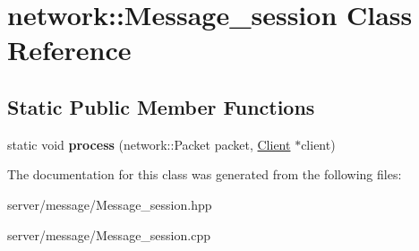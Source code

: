 \hypertarget{classnetwork_1_1_message__session}{\section{network\-:\-:Message\-\_\-session Class Reference}
\label{classnetwork_1_1_message__session}
}
\subsection*{Static Public Member Functions}
\begin{DoxyCompactItemize}
\item 
\hypertarget{classnetwork_1_1_message__session_a54897235c3764e77e414630174e030e2}{static void {\bfseries process} (network\-::\-Packet packet, \hyperlink{class_client}{Client} $\ast$client)}\label{classnetwork_1_1_message__session_a54897235c3764e77e414630174e030e2}

\end{DoxyCompactItemize}


The documentation for this class was generated from the following files\-:\begin{DoxyCompactItemize}
\item 
server/message/Message\-\_\-session.\-hpp\item 
server/message/Message\-\_\-session.\-cpp\end{DoxyCompactItemize}
